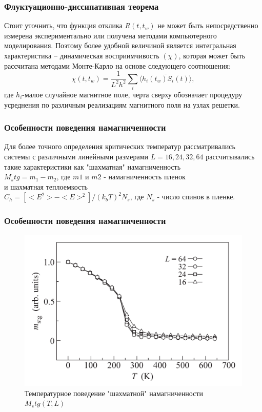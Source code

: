 \documentclass[pdf,unicode]{beamer}
\begin{document}
\begin{frame}
\frametitle{Флуктуационно-диссипативная теорема}
Стоит уточнить, что функция отклика $R(t,t_w)$ не может быть непосредственно измерена экспериментально или получена методами компьютерного моделирования. Поэтому более удобной величиной является интегральная характеристика -- динамическая восприимчивость $(\chi)$, которая может быть рассчитана методами Монте-Карло на основе следующего соотношения:
\begin{equation}
\chi(t,t_w) = \frac{1}{L^2h^2} \sum\limits_i \overline{\langle h_i(t_w)S_i(t)\rangle},
\end{equation}
где $h_i$-малое случайное магнитное поле, черта сверху обозначает процедуру усреднения
по различным реализациям магнитного поля на узлах решетки.
\end{frame}
\begin{frame}

\frametitle{Особенности поведения намагниченности}
Для более точного определения критических температур рассматривались системы с различными линейными размерами $L = 16,24,32,64$ рассчитывались такие характеристики как "шахматная" намагниченность	\\
$M_stg = m_1 - m_2$, где $m1$ и $m2$ - намагниченность пленок\\ и шахматная теплоемкость \\$C_h = [<E^2>-<E>^2]/(k_b T)^2 N_s$, где $N_s$ - число спинов в пленке.
\end{frame}
\begin{frame}

\frametitle{Особенности поведения намагниченности}

\begin{figure}
	\includegraphics[width=1\textwidth]{Image2.png}
	\caption{\scriptsize Температурное поведение "шахматной" намагниченности $M_stg(T,L)$}
	
\end{figure}
\end{frame}
\end{document}
